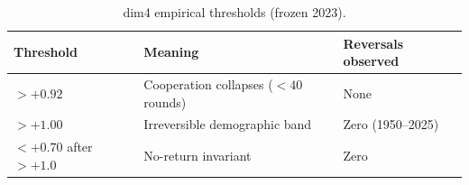 \begin{table}[h]
\centering
\begin{tabular}{lll}
\toprule
Threshold & Meaning & Reversals observed \\
\midrule
$> +0.92$ & Cooperation collapses ($<40$ rounds) & None \\
$> +1.00$ & Irreversible demographic band & Zero (1950--2025) \\
$< +0.70$ after $>+1.0$ & No-return invariant & Zero \\
\bottomrule
\end{tabular}
\caption{dim4 empirical thresholds (frozen 2023).}
\label{tab:dim4-thresholds}
\end{table}